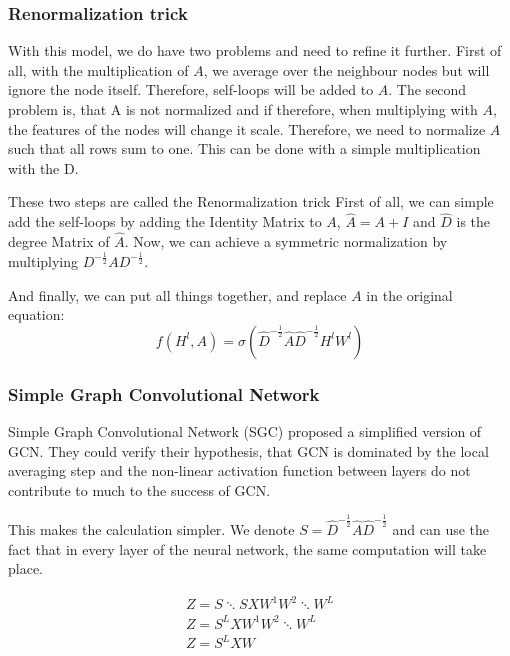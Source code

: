 \subsubsection{Renormalization trick}

With this model, we do have two problems and need to refine it further.
First of all, with the multiplication of $A$, we average over the neighbour nodes but
will ignore the node itself. Therefore, self-loops will be added to $A$.
The second problem is, that A is not normalized and if therefore, when multiplying with $A$,
the features of the nodes will change it scale. Therefore, we need to normalize $A$
such that all rows sum to one. This can be done with a simple multiplication with the D.

These two steps are called the Renormalization trick \cite{GCN}
First of all, we can simple add the self-loops by adding the Identity Matrix to $A$, 
$\hat{A} = A + I$ and $\hat{D}$ is the degree Matrix of $\hat{A}$.
Now, we can achieve a symmetric normalization by multiplying $D^{-\frac{1}{2}} A D^{-\frac{1}{2}}$.

And finally, we can put all things together, and replace $A$ in the original equation:
\begin{equation}
    f( H^l, A) = \sigma (\hat{D}^{-\frac{1}{2}} \hat{A} \hat{D}^{-\frac{1}{2}} H^l W^l)
\end{equation} 


\subsubsection{Simple Graph Convolutional Network}
Simple Graph Convolutional Network (SGC) \cite{simpleGCN} proposed a simplified version of GCN.
They could verify their hypothesis, that GCN is dominated by the local averaging step and the non-linear 
activation function between layers do not contribute to much to the success of GCN.

This makes the calculation simpler. We denote $S = \hat{D}^{-\frac{1}{2}} \hat{A} \hat{D}^{-\frac{1}{2}} $
and can use the fact that in every layer of the neural network, the same computation will take place.

\begin{equation}
    \begin{aligned}
        Z = S \ddots S X W^1 W^2 \ddots W^L \\
        Z = S^L X W^1 W^2 \ddots W^L \\
        Z = S^L X W    
    \end{aligned}
\end{equation}

